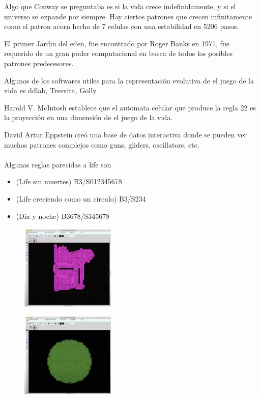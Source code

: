 \documentclass[10pt]{article}
\begin{document}
Algo que Conway se preguntaba es si la vida crece indefinidamente, y si el universo se expande por siempre. Hay ciertos patrones que crecen infinitamente como el patron acorn hecho de 7 celulas con una estabilidad en 5206 pasos. 

El primer Jardin del eden, fue encontrado por Roger Banks en 1971, fue requerido de un gran poder computacional en busca de todos los posibles patrones predecesores.

Algunos de los softwares utiles para la representación evolutiva de el juego de la vida es ddlab, Tresvita, Golly

Harold V. McIntosh establece que el automata celular que produce la regla 22 es la proyección en una dimensión de el juego de la vida.

David Artur Eppstein creó una base de datos interactiva donde se pueden ver muchos patrones complejos como guns, gliders, oscillators, etc.\\ \\
Algunas reglas parecidas a life son 
\begin{itemize}
    \item(Life sin muertes) B3/S012345678

    \item(Life creciendo como un circulo) B3/S234
    \item(Dia y noche) B3678/S345678
\end{itemize}
\begin{figure}[h!]
    \centering
    \includegraphics[width=0.4\textwidth]{lifesinmuerte.png}
\end{figure}
\begin{figure}[h!]
    \centering
    \includegraphics[width=0.4\textwidth]{vidacirculo.png}
\end{figure}
\end{document}
